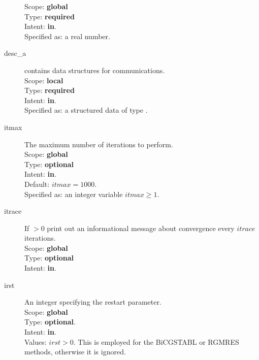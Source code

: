 \begin{description}
Scope: {\bf global} \\
Type: {\bf required}\\
Intent: {\bf in}.\\
Specified as: a real number. 
\item[desc\_a] contains data structures for communications.\\
Scope: {\bf local} \\
Type: {\bf required}\\
Intent: {\bf in}.\\
Specified as: a structured data of type \descdata.
\item[itmax]  The maximum number of iterations to perform.\\
Scope: {\bf global} \\
Type: {\bf optional}\\
Intent: {\bf in}.\\
Default: $itmax = 1000$.\\
Specified as: an integer variable $itmax \ge 1$.
\item[itrace] If $>0$  print out an informational message about
  convergence  every $itrace$ iterations.\\ 
Scope: {\bf global} \\
Type: {\bf optional}\\
Intent: {\bf in}.\\
\item[irst]  An integer specifying the restart parameter.\\
Scope: {\bf global} \\
Type: {\bf optional}.\\
Intent: {\bf in}.\\
Values: $irst>0$. This is employed for the BiCGSTABL or RGMRES
methods, otherwise it is ignored. 


\end{description}
